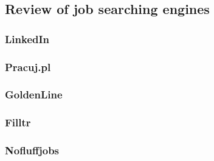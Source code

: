 \subsection{Review of job searching engines}
\subsubsection{LinkedIn}
\subsubsection{Pracuj.pl}
\subsubsection{GoldenLine}
\subsubsection{Filltr}
\subsubsection{Nofluffjobs}




